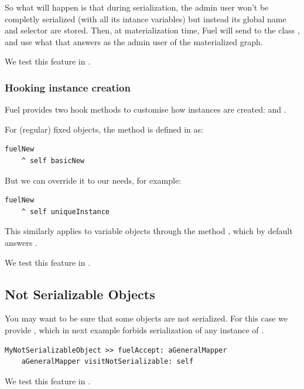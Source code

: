 \documentclass[a4paper,10pt,twoside]{book}
\begin{document}
So what will happen is that during serialization, the admin user won't be completly serialized (with all its intance variables) but instead its global name and selector are stored. Then, at materialization time, Fuel will send  to the class , and use what that answers as the admin user of the materialized graph. 

We test this feature in .

\subsubsection{Hooking instance creation}

Fuel provides two hook methods to customise how instances are created:  and .

For (regular) fixed objects, the method  is defined in  as:

\begin{lstlisting}
fuelNew
	^ self basicNew
\end{lstlisting}

But we can override it to our needs, for example:

\begin{lstlisting}
fuelNew
	^ self uniqueInstance
\end{lstlisting}

This similarly applies to variable objects through the method , which by default answers .

We test this feature in .

\subsection{Not Serializable Objects}

You may want to be sure that some objects are not serialized. For this case we provide , which in next example forbids serialization of any instance of .

\begin{lstlisting}
MyNotSerializableObject >> fuelAccept: aGeneralMapper
    aGeneralMapper visitNotSerializable: self
\end{lstlisting}

We test this feature in .
\end{document}

